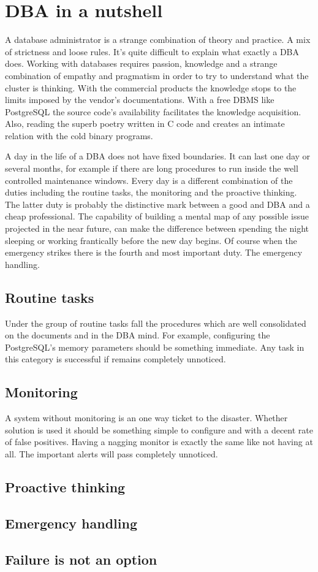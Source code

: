 \chapter{DBA in a nutshell}
A database administrator is a strange combination of theory and practice. A mix of strictness and loose 
rules. It's quite difficult to explain what exactly a DBA does. Working with databases requires passion, 
knowledge and a strange combination of empathy and pragmatism in order to try to understand what the 
cluster is thinking. With the commercial products the knowledge stops to the limits imposed by the vendor's 
documentations. With a free DBMS like PostgreSQL the source code's availability facilitates the knowledge 
acquisition. Also, reading the superb poetry written in C code and creates an intimate relation with the 
cold binary programs.\newline

A day in the life of a DBA does not have fixed boundaries. It can last one day or several months, for 
example if there are long procedures to run inside the well controlled maintenance windows. Every day 
is a different combination of the duties including the routine tasks, the monitoring and the proactive 
thinking. The latter duty is probably the distinctive mark between a good and DBA and a cheap professional. 
The capability of building a mental map of any possible issue projected in the near future, can make the 
difference between spending the night sleeping or working frantically before the new day begins. Of course 
when the emergency strikes there is the fourth and most important duty. The emergency handling. 

\section{Routine tasks}
Under the group of routine tasks fall the procedures which are well consolidated on the documents and in 
the DBA mind. For example, configuring the PostgreSQL's memory parameters should be something immediate. 
Any task in this category is successful if remains completely unnoticed.

\section{Monitoring}
A system without monitoring is an one way ticket to the disaster. Whether solution is used it should be 
something simple to configure and with a decent rate of false positives. Having a nagging monitor is 
exactly the same like not having at all. The important alerts will pass completely unnoticed. 


\section{Proactive thinking}

\section{Emergency handling}

\section{Failure is not an option}